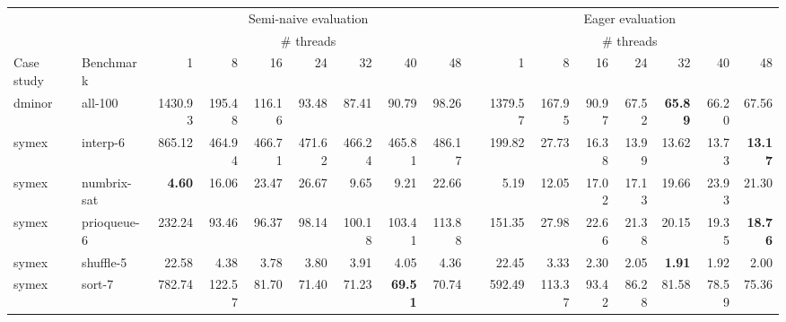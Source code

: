 \documentclass{article}
\begin{document}
\scriptsize
\begin{landscape}
\begin{tabular}{llrrrrrrrrrrrrrrr}
\toprule
& & \multicolumn{7}{c}{Semi-naive evaluation} & & \multicolumn{7}{c}{Eager evaluation} \\
\cline{3-9} \cline{11-17}
& & \multicolumn{7}{c}{\# threads} & & \multicolumn{7}{c}{\# threads}\\
Case study & Benchmark& 1 & 8 & 16 & 24 & 32 & 40 & 48& & 1 & 8 & 16 & 24 & 32 & 40 & 48\\
\midrule
dminor & all-100 & 1430.93 & 195.48 & 116.16 & 93.48 & 87.41 & 90.79 & 98.26 & & 1379.57 & 167.95 & 90.97 & 67.52 & {\bf 65.89} & 66.20 & 67.56\\
symex & interp-6 & 865.12 & 464.94 & 466.71 & 471.62 & 466.24 & 465.81 & 486.17 & & 199.82 & 27.73 & 16.38 & 13.99 & 13.62 & 13.73 & {\bf 13.17}\\
symex & numbrix-sat & {\bf 4.60} & 16.06 & 23.47 & 26.67 & 9.65 & 9.21 & 22.66 & & 5.19 & 12.05 & 17.02 & 17.13 & 19.66 & 23.93 & 21.30\\
symex & prioqueue-6 & 232.24 & 93.46 & 96.37 & 98.14 & 100.18 & 103.41 & 113.88 & & 151.35 & 27.98 & 22.66 & 21.38 & 20.15 & 19.35 & {\bf 18.76}\\
symex & shuffle-5 & 22.58 & 4.38 & 3.78 & 3.80 & 3.91 & 4.05 & 4.36 & & 22.45 & 3.33 & 2.30 & 2.05 & {\bf 1.91} & 1.92 & 2.00\\
symex & sort-7 & 782.74 & 122.57 & 81.70 & 71.40 & 71.23 & {\bf 69.51} & 70.74 & & 592.49 & 113.37 & 93.42 & 86.28 & 81.58 & 78.59 & 75.36\\
\bottomrule
\end{tabular}
\end{landscape}
\end{document}

